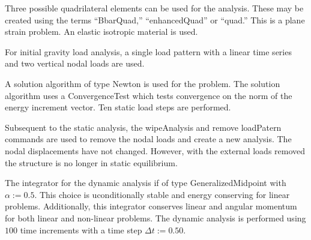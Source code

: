 \documentclass[12pt]{article}
\begin{document}
Three possible quadrilateral elements can be used for the analysis.
These may be created using the terms
``BbarQuad,''
``enhancedQuad'' or
``quad.''  This is a plane strain problem.
An elastic isotropic material is used.

For initial gravity load analysis, a single load pattern 
with a linear time series and two vertical nodal loads are used. 


\vspace{0.2in}

A solution algorithm of type Newton is used for the 
problem. The solution algorithm uses a ConvergenceTest which tests
convergence on the norm of the energy increment vector. 
Ten static load steps are performed.

Subsequent to the static analysis, the wipeAnalysis and 
remove loadPatern commands are used 
to remove the nodal loads and create a new analysis.  The nodal 
displacements have not changed.  However, with the external loads removed
the structure is no longer in static equilibrium.

The integrator for the dynamic analysis if of type 
GeneralizedMidpoint with $\alpha := 0.5$.  This choice 
is uconditionally stable and energy conserving for linear problems.
Additionally, this integrator conserves linear and
angular momentum for both linear and non-linear problems.
The dynamic analysis is performed using $100$ time increments with
a time step $\Delta t := 0.50$.
\end{document}
